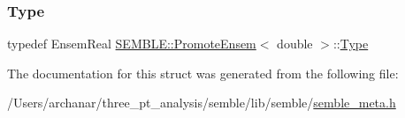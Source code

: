 \subsubsection{\texorpdfstring{Type}{Type}\hspace{0.1cm}{\footnotesize\ttfamily [2/2]}}
{\footnotesize\ttfamily typedef Ensem\+Real \mbox{\hyperlink{structSEMBLE_1_1PromoteEnsem}{S\+E\+M\+B\+L\+E\+::\+Promote\+Ensem}}$<$ double $>$\+::\mbox{\hyperlink{structSEMBLE_1_1PromoteEnsem_3_01double_01_4_aa25564164713a24da3902cc7c4483bf9}{Type}}}



The documentation for this struct was generated from the following file\+:\begin{DoxyCompactItemize}
\item 
/\+Users/archanar/three\+\_\+pt\+\_\+analysis/semble/lib/semble/\mbox{\hyperlink{lib_2semble_2semble__meta_8h}{semble\+\_\+meta.\+h}}\end{DoxyCompactItemize}
